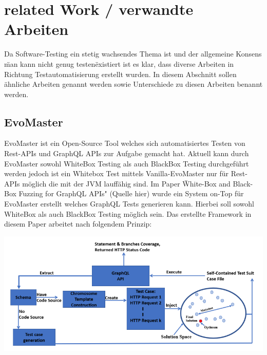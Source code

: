 \chapter{related Work / verwandte Arbeiten}

Da Software-Testing ein stetig wachsendes Thema ist und der allgemeine Konsens \"man kann nicht genug testen\" existiert ist
es klar, dass diverse Arbeiten in Richtung Testautomatisierung erstellt wurden. In diesem Abschnitt sollen ähnliche Arbeiten
genannt werden sowie Unterschiede zu diesen Arbeiten benannt werden.

\section{EvoMaster}

EvoMaster ist ein Open-Source Tool welches sich automatisiertes Testen von Rest-APIs und GraphQL APIs zur Aufgabe gemacht hat.
Aktuell kann durch EvoMaster sowohl WhiteBox Testing als auch BlackBox Testing durchgeführt werden jedoch ist ein
Whitebox Test mittels Vanilla-EvoMaster nur für Rest-APIs möglich die mit der JVM lauffähig sind.
Im Paper \"White-Box and Black-Box Fuzzing for GraphQL APIs" (Quelle hier) wurde ein System on-Top für EvoMaster
erstellt welches GraphQL Tests generieren kann. Hierbei soll sowohl WhiteBox als auch BlackBox Testing möglich sein.
Das erstellte Framework in diesem Paper arbeitet nach folgendem Prinzip:

\begin{center}
    \includegraphics[width=\textwidth,height=\textheight,keepaspectratio]{content/hauptteil/related Work/evomaster_framework}
\end{center}

